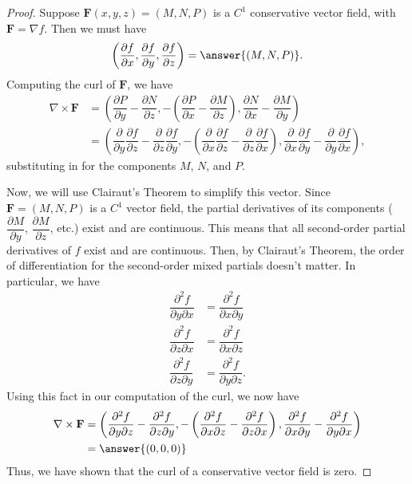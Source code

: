 \documentclass{ximera}
\begin{document}
\begin{proof}
Suppose $\mathbf{F}(x,y,z)=(M,N,P)$ is a $C^1$ conservative vector field, with $\mathbf{F}=\nabla f$. Then we must have
\[
\left(\dfrac{\partial f}{\partial x}, \dfrac{\partial f}{\partial y}, \dfrac{\partial f}{\partial z}\right) = \answer{(M,N,P)}.
\]
Computing the curl of $\mathbf{F}$, we have
\begin{align*}
\nabla\times\mathbf{F} &= \left(\dfrac{\partial P}{\partial y}-\dfrac{\partial N}{\partial z}, -\left(\dfrac{\partial P}{\partial x}-\dfrac{\partial M}{\partial z}\right), \dfrac{\partial N}{\partial x} - \dfrac{\partial M}{\partial y}\right)\\
&= \left(\dfrac{\partial}{\partial y}\dfrac{\partial f}{\partial z}-\dfrac{\partial}{\partial z}\dfrac{\partial f}{\partial y}, -\left(\dfrac{\partial}{\partial x}\dfrac{\partial f}{\partial z}-\dfrac{\partial}{\partial z}\dfrac{\partial f}{\partial x}\right), \dfrac{\partial}{\partial x}\dfrac{\partial f}{\partial y} - \dfrac{\partial}{\partial y}\dfrac{\partial f}{\partial x}\right),
\end{align*}
substituting in for the components $M$, $N$, and $P$.

Now, we will use Clairaut's Theorem to simplify this vector. Since $\mathbf{F}=(M,N,P)$ is a $C^1$ vector field, the partial derivatives of its components ($\dfrac{\partial M}{\partial y}$, $\dfrac{\partial M}{\partial z}$, etc.) exist and are continuous. This means that all second-order partial derivatives of $f$ exist and are continuous. Then, by Clairaut's Theorem, the order of differentiation for the second-order mixed partials doesn't matter. In particular, we have
\begin{align*}
\dfrac{\partial^2 f}{\partial y\partial x} &= \dfrac{\partial^2 f}{\partial x\partial y}\\
\dfrac{\partial^2 f}{\partial z\partial x} &= \dfrac{\partial^2 f}{\partial x\partial z}\\
\dfrac{\partial^2 f}{\partial z\partial y} &= \dfrac{\partial^2 f}{\partial y\partial z}.
\end{align*}
Using this fact in our computation of the curl, we now have
\begin{align*}
\nabla\times\mathbf{F} &= \left(\dfrac{\partial^2 f}{\partial y\partial z}-\dfrac{\partial^2 f}{\partial z\partial y}, -\left(\dfrac{\partial^2 f}{\partial x\partial z}-\dfrac{\partial^2 f}{\partial z\partial x}\right), \dfrac{\partial^2 f}{\partial x\partial y} - \dfrac{\partial^2 f}{\partial y\partial x}\right) \\
&= \answer{(0,0,0)}
\end{align*}
Thus, we have shown that the curl of a conservative vector field is zero.
\end{proof}
\end{document}

